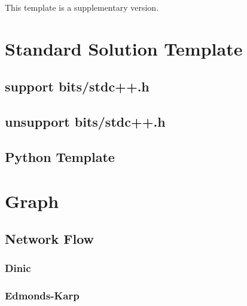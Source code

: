 \documentclass[10pt,UTF8,a4paper,twoside]{ctexart}
\begin{document}
\newpage
\begin{Large}
This template is a supplementary version.
\end{Large}
\mbox{}
\thispagestyle{empty}
\newpage
\begin{multicols}{2}
\columnseprule=0.5pt

\renewcommand \contentsname{Contents}
\tableofcontents
\thispagestyle{empty}

\clearpage


\setcounter{page}{1}
\pagestyle{headings}

\section{Standard Solution Template}
	\subsection{support bits/stdc++.h}
		
	\subsection{unsupport bits/stdc++.h}
		
	\subsection{Python Template}
		
	
\clearpage

\section{Graph}
	\subsection{Network Flow}
		\subsubsection{Dinic}
			
		\subsubsection{Edmonds-Karp}
			

\end{multicols}
\end{document}

